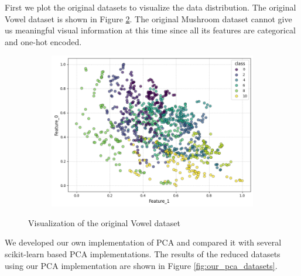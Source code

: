 First we plot the original datasets to visualize the data distribution.
The original Vowel dataset is shown in Figure \ref{fig:vowel_dataset}.
The original Mushroom dataset cannot give us meaningful visual information at this time 
since all its features are categorical and one-hot encoded. 

\begin{figure}[h!]
    \centering
    \begin{subfigure}[b]{0.45\textwidth}
        \centering
        \includegraphics[width=\textwidth]{figures/vowel_dataset.png}
        \label{Img6}
    \end{subfigure}
    
    \caption{Visualization of the original Vowel dataset}
    \label{fig:vowel_dataset}
\end{figure}

We developed our own implementation of PCA and compared it with several scikit-learn based PCA implementations.
The results of the reduced datasets using our PCA implementation are shown in Figure \ref{fig:our_pca_datasets}.

